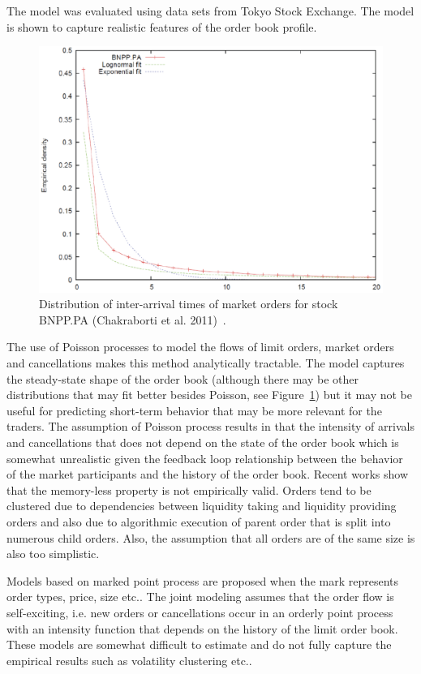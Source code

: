 The model was evaluated using data sets from Tokyo Stock Exchange. The model is shown to capture realistic features of the order book profile.
	\begin{figure}[!ht]
   	\centering
   	\includegraphics[width=\textwidth]{chapters/chapter_trade_data_models/figures/intertime.png} 
   	\caption{Distribution of inter-arrival times of market orders for stock BNPP.PA (Chakraborti et al. 2011)~\cite{chaktokpat}. \label{fig:intertimefig}}
	\end{figure}


The use of Poisson processes to model the flows of limit orders, market orders and cancellations makes this method analytically tractable. The model captures the steady-state shape of the order book (although there may be other distributions that may fit better besides Poisson, see Figure~\ref{fig:intertimefig}) but it may not be useful for predicting short-term behavior that may be more relevant for the traders. The assumption of Poisson process results in that the intensity of arrivals and cancellations that does not depend on the state of the order book which is somewhat unrealistic given the feedback loop relationship between the behavior of the market participants and the history of the order book. Recent works show that the memory-less property is not empirically valid. Orders tend to be clustered due to dependencies between liquidity taking and liquidity providing orders and also due to algorithmic execution of parent order that is split into numerous child orders. Also, the assumption that all orders are of the same size is also too simplistic. 


Models based on marked point process are proposed when the mark represents order types, price, size etc.. The joint modeling assumes that the order flow is self-exciting, i.e. new orders or cancellations occur in an orderly point process with an intensity function that depends on the history of the limit order book. These models are somewhat difficult to estimate and do not fully capture the empirical results such as volatility clustering etc.. \twomedskip


